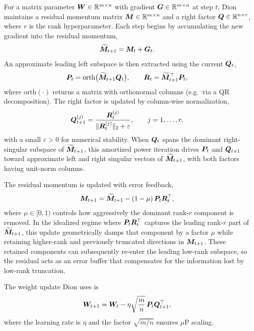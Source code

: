 \documentclass{article} %
\newcounter{idea}
\begin{document}
For a matrix parameter ${\boldsymbol W} \in \mathbb{R}^{m \times n}$ with gradient ${\boldsymbol G} \in \mathbb{R}^{m \times n}$ at step $t$, Dion maintains a residual momentum matrix ${\boldsymbol M} \in \mathbb{R}^{m \times n}$ and a right factor ${\boldsymbol Q} \in \mathbb{R}^{n \times r}$, where $r$ is the rank hyperparameter. Each step begins by accumulating the new gradient into the residual momentum,
\begin{equation*}
  \widetilde{{\boldsymbol M}}_{t+1} = {\boldsymbol M}_t + {\boldsymbol G}_t.
\end{equation*}
An approximate leading left subspace is then extracted using the current ${\boldsymbol Q}_t$,
\begin{equation*}
  {\boldsymbol P}_t = \mathrm{orth}\bigl(\widetilde{{\boldsymbol M}}_{t+1} {\boldsymbol Q}_t\bigr),
  \qquad
  {\boldsymbol R}_t = \widetilde{{\boldsymbol M}}_{t+1}^\top {\boldsymbol P}_t,
\end{equation*}
where $\mathrm{orth}(\cdot)$ returns a matrix with orthonormal columns (e.g.\ via a QR decomposition). The right factor is updated by column-wise normalization,
\begin{equation*}
  {\boldsymbol Q}_{t+1}^{(j)} = \frac{{\boldsymbol R}_t^{(j)}}{\|{\boldsymbol R}_t^{(j)}\|_2 + \varepsilon},
  \qquad j = 1,\dots,r,
\end{equation*}
with a small $\varepsilon > 0$ for numerical stability. When ${\boldsymbol Q}_t$ spans the dominant right-singular subspace of $\widetilde{{\boldsymbol M}}_{t+1}$, this amortized power iteration drives ${\boldsymbol P}_t$ and ${\boldsymbol Q}_{t+1}$ toward approximate left and right singular vectors of $\widetilde{{\boldsymbol M}}_{t+1}$, with both factors having unit-norm columns.

The residual momentum is updated with error feedback,
\begin{equation*}
  {\boldsymbol M}_{t+1} = \widetilde{{\boldsymbol M}}_{t+1} - (1 - \mu)\, {\boldsymbol P}_t {\boldsymbol R}_t^\top,
\end{equation*}
where $\mu \in [0,1)$ controls how aggressively the dominant rank-$r$ component is removed. In the idealized regime where ${\boldsymbol P}_t {\boldsymbol R}_t^\top$ captures the leading rank-$r$ part of $\widetilde{{\boldsymbol M}}_{t+1}$, this update geometrically damps that component by a factor $\mu$ while retaining higher-rank and previously truncated directions in ${\boldsymbol M}_{t+1}$. These retained components can subsequently re-enter the leading low-rank subspace, so the residual acts as an error buffer that compensates for the information lost by low-rank truncation.

The weight update Dion uses is
\begin{equation*}
  {\boldsymbol W}_{t+1}
  = {\boldsymbol W}_t
    - \eta \sqrt{\frac{m}{n}}\, {\boldsymbol P}_t {\boldsymbol Q}_{t+1}^\top,
\end{equation*}
where the learning rate is $\eta$ and the factor $\sqrt{m/n}$ ensures $\mu$P scaling.
\end{document}
